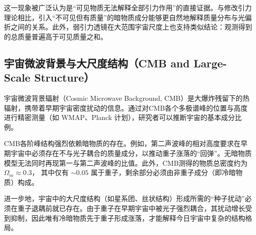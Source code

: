 这一现象被广泛认为是“可见物质无法解释全部引力作用”的直接证据。与修改引力理论相比，引入“不可见但有质量”的暗物质成分能够更自然地解释质量分布与光偏折之间的关系。此外，弱引力透镜在大范围宇宙尺度上也支持类似结论：观测得到的总质量普遍高于可见质量之和。

\subsection{宇宙微波背景与大尺度结构（CMB and Large-Scale Structure）}

宇宙微波背景辐射（Cosmic Microwave Background, CMB）是大爆炸残留下的热辐射，携带着早期宇宙密度扰动的信息。通过对CMB各个多极谱峰的位置与高度进行精密测量（如 WMAP、Planck 计划），研究者可以推断宇宙的基本成分比例。

CMB各阶峰结构强烈依赖暗物质的存在。例如，第二声波峰的相对高度要求在早期宇宙中必须存在不与光子耦合的质量成分，以推动重子涨落的“回弹”。无暗物质模型无法同时再现第一与第二声波峰的比值。此外，CMB测得的物质总密度约为 $\Omega_m\approx 0.3 $， 其中仅有 $\sim 0.05 $ 属于重子，剩余部分必须由非重子成分（即冷暗物质）构成。

进一步地，宇宙中的大尺度结构（如星系团、丝状结构）形成所需的“种子扰动”必须在重子退耦前就已存在。由于重子在早期宇宙中被光子强烈耦合，其扰动增长受到抑制，因此唯有冷暗物质先于重子形成涨落，才能解释今日宇宙中复杂的结构格局。

\newpage